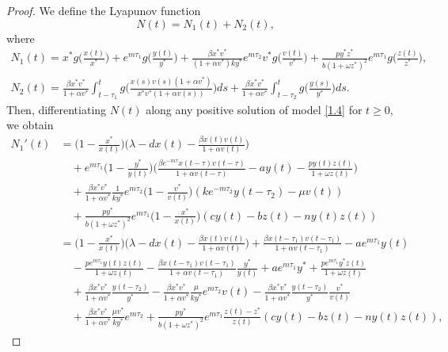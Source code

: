 \documentclass[reqno]{amsart}
\begin{document}
\begin{proof}
We define the Lyapunov function 
$$
N(t)=N_{1}(t)+N_{2}(t),
$$
where
\begin{gather*}
N_{1}(t)=x^{*} g\Big(\frac{x(t)}{x^{*}}\Big)
 +e^{m\tau_1}g\Big(\frac{y(t)}{y^{*}}\Big)+\frac{\beta x^{*}v^{*}}{(1+\alpha v^{*})ky^{*}}e^{m\tau_2}v^{*}
g\Big(\frac{v(t)}{v^{*}}\Big)+\frac{py^{*}z^{*}}{b(1+\omega z^{*})^{2}}
e^{m\tau_1}g\Big(\frac{z(t)}{z^{*}}\Big), \\
N_{2}(t)=\frac{\beta x^{*}v^{*}}{1+\alpha v^{*}}\int _{t-\tau_{1}}^{t}
 g\Big(\frac{x(s)v(s)(1+\alpha v^{*})}{x^{*}v^{*}(1+\alpha v(s))}\Big)ds
+\frac{\beta x^{*}v^{*}}{1+\alpha v^{*}}\int _{t-\tau_{2}}^{t}
 g\Big(\frac{y(s)}{y^{*}}\Big)ds.
\end{gather*}
Then, differentiating $N(t)$ along any positive solution of model \eqref{1.4} 
for $t\geq 0$, we obtain
\begin{align*}
N_{1}'(t)
&= \Big(1-\frac{x^{*}}{x(t)}\Big)\Big(\lambda-dx(t)
 -{\frac{\beta x(t)v(t)}{1+\alpha v(t)}}\Big)\\
&\quad +e^{m\tau_1}\Big(1-\frac{y^{*}}{y(t)}\Big)
 \Big({\frac{\beta e^{-m\tau}x(t-\tau)v(t-\tau)}{1+\alpha v(t-\tau)}}-ay(t)
 -{\frac{py(t)z(t)}{1+\omega z(t)}}\Big)\\
&\quad +\frac{\beta x^{*}v^{*}}{1+\alpha v^{*}}\frac{1}{ky^{*}}e^{m\tau_2}
 \Big(1-\frac{v^{*}}{v(t)}\Big)(ke^{-m\tau_2}y(t-\tau_2)-\mu v(t))\\
&\quad +\frac{py^{*}}{b(1+\omega z^{*})^{2}}e^{m\tau_1}
 \Big(1-\frac{x^{*}}{x(t)}\Big)(cy(t)-bz(t)-ny(t)z(t))\\
&= \Big(1-\frac{x^{*}}{x(t)}\Big)
 \Big(\lambda-dx(t)-{\frac{\beta x(t)v(t)}{1+\alpha v(t)}}\Big)
 +\frac{\beta x(t-\tau_{1})v(t-\tau_{1})}{1+\alpha v(t-\tau_{1})}-ae^{m\tau_1}y(t) \\
&\quad -\frac{pe^{m\tau_{1}} y(t)z(t)}{1+\omega z(t)}
 -\frac{\beta x(t-\tau_{1})v(t-\tau_{1})}{1+\alpha v(t-\tau_{1})}\frac{y^{*}}{y(t)}
 +ae^{m\tau_1}y^{*}+\frac{pe^{m\tau_{1}} y^{*}z(t)}{1+\omega z(t)}\\
&\quad +\frac{\beta x^{*}v^{*}}{1+\alpha v^{*}}\frac{y(t-\tau_{2})}{y^{*}}
 -\frac{\beta x^{*}v^{*}}{1+\alpha v^{*}}\frac{\mu}{ky^{*}}e^{m\tau_2}v(t)
 -\frac{\beta x^{*}v^{*}}{1+\alpha v^{*}}\frac{y(t-\tau_{2})}{y^{*}}\frac{v^{*}}{v(t)}\\
&\quad +\frac{\beta x^{*}v^{*}}{1+\alpha v^{*}}\frac{\mu v^{*}}{ky^{*}}e^{m\tau_2}
 +\frac{py^{*}}{b(1+\omega z^{*})^{2}}e^{m\tau_1}\frac{z(t)-z^{*}}{z(t)}(cy(t)
 -bz(t)-ny(t)z(t)),
\end{align*}

\end{proof}
\end{document}
